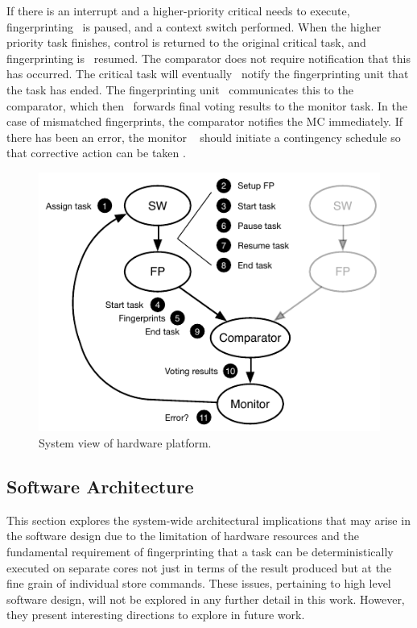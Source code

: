 	If there is an interrupt and a higher-priority critical needs to execute, fingerprinting ~is paused, and a context switch performed.
	When the higher priority task finishes, control is returned to the original critical task, and fingerprinting is ~resumed.
	The comparator does not require notification that this has occurred.
	The critical task will eventually ~notify the fingerprinting unit that  the task has ended.
	The fingerprinting unit ~communicates this to the comparator, which then ~forwards final voting results to the monitor task. In the case of mismatched fingerprints, the comparator notifies the MC immediately.
	If there has been an error, the monitor ~ should initiate a contingency schedule so that corrective action can be taken \cite{bolchini2013reliability}.
\begin{figure}[h]
\centering
\includegraphics[scale=1.3]{Figures/interfaces}
\caption{System view of hardware platform.}
\label{f:control_flow}
\end{figure}

\subsection{Software Architecture}
 
This section explores the system-wide architectural implications that may arise in the software design due to the limitation of hardware resources and the fundamental requirement of fingerprinting that a task can be deterministically executed on separate cores not just in terms of the result produced but at the fine grain of individual store commands. These issues, pertaining to high level software design, will not be explored in any further detail in this work. However, they present interesting directions to explore in future work.

